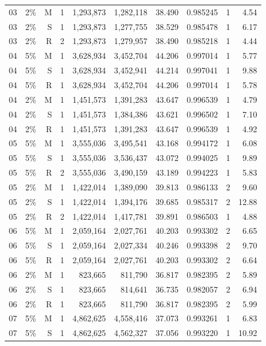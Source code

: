 \documentclass[10pt,a4paper]{article}
\begin{document}
\begin{longtable}{llrlrrrlrr}
03 & 2\% & M & 1 & 1,293,873 & 1,282,118 & 38.490 & 0.985245 & 1 & 4.54 \\
03 & 2\% & S & 1 & 1,293,873 & 1,277,755 & 38.529 & 0.985478 & 1 & 6.17 \\
03 & 2\% & R & 2 & 1,293,873 & 1,279,957 & 38.490 & 0.985218 & 1 & 4.44 \\
04 & 5\% & M & 1 & 3,628,934 & 3,452,704 & 44.206 & 0.997014 & 1 & 5.77 \\
04 & 5\% & S & 1 & 3,628,934 & 3,452,941 & 44.214 & 0.997041 & 1 & 9.88 \\
04 & 5\% & R & 1 & 3,628,934 & 3,452,704 & 44.206 & 0.997014 & 1 & 5.78 \\
04 & 2\% & M & 1 & 1,451,573 & 1,391,283 & 43.647 & 0.996539 & 1 & 4.79 \\
04 & 2\% & S & 1 & 1,451,573 & 1,384,386 & 43.621 & 0.996502 & 1 & 7.10 \\
04 & 2\% & R & 1 & 1,451,573 & 1,391,283 & 43.647 & 0.996539 & 1 & 4.92 \\
05 & 5\% & M & 1 & 3,555,036 & 3,495,541 & 43.168 & 0.994172 & 1 & 6.08 \\
05 & 5\% & S & 1 & 3,555,036 & 3,536,437 & 43.072 & 0.994025 & 1 & 9.89 \\
05 & 5\% & R & 2 & 3,555,036 & 3,490,159 & 43.189 & 0.994223 & 1 & 5.83 \\
05 & 2\% & M & 1 & 1,422,014 & 1,389,090 & 39.813 & 0.986133 & 2 & 9.60 \\
05 & 2\% & S & 1 & 1,422,014 & 1,394,176 & 39.685 & 0.985317 & 2 & 12.88 \\
05 & 2\% & R & 2 & 1,422,014 & 1,417,781 & 39.891 & 0.986503 & 1 & 4.88 \\
06 & 5\% & M & 1 & 2,059,164 & 2,027,761 & 40.203 & 0.993302 & 2 & 6.65 \\
06 & 5\% & S & 1 & 2,059,164 & 2,027,334 & 40.246 & 0.993398 & 2 & 9.70 \\
06 & 5\% & R & 1 & 2,059,164 & 2,027,761 & 40.203 & 0.993302 & 2 & 6.64 \\
06 & 2\% & M & 1 & 823,665 & 811,790 & 36.817 & 0.982395 & 2 & 5.89 \\
06 & 2\% & S & 1 & 823,665 & 814,641 & 36.735 & 0.982057 & 2 & 6.94 \\
06 & 2\% & R & 1 & 823,665 & 811,790 & 36.817 & 0.982395 & 2 & 5.99 \\
07 & 5\% & M & 1 & 4,862,625 & 4,558,416 & 37.073 & 0.993261 & 1 & 6.83 \\
07 & 5\% & S & 1 & 4,862,625 & 4,562,327 & 37.056 & 0.993220 & 1 & 10.92 \\

\end{longtable}
\end{document}
